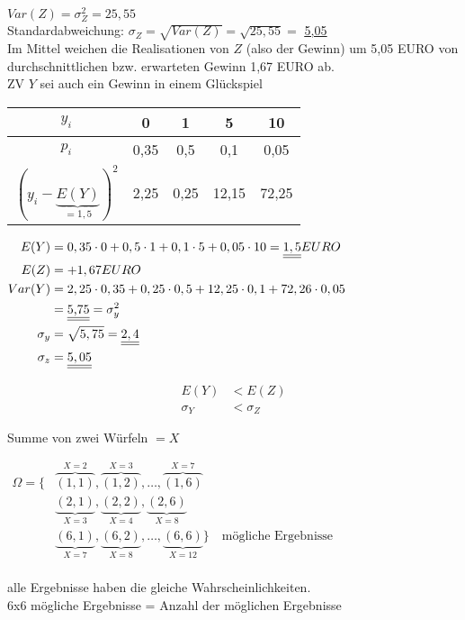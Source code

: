 $Var(Z) = \sigma_Z^2 = 25,55$\\
Standardabweichung: $\sigma_Z = \sqrt{Var(Z)} = \sqrt{25,55} = $ \underline{\underline{5,05}} \\

Im Mittel weichen die Realisationen von $Z$ (also der Gewinn) um 5,05 EURO von durchschnittlichen bzw. erwarteten Gewinn 1,67 EURO ab.\\

ZV $Y$ sei auch ein Gewinn in einem Glückspiel

\begin{tabular}{c | c c c c}
	$y_i$		&		0		&		1		&		5		&		10	\\
	\hline
	$p_i$		&	0,35	& 0,5		&		0,1	&	0,05  \\
	$(y_i -\underbrace{E(Y)}_{= 1,5})^2$
					&	2,25	&	0,25	&	12,15	&	72,25
\end{tabular}

$\begin{aligned}
	E(Y) &= 0,35 \cdot 0 + 0,5 \cdot 1 + 0,1 \cdot 5 + 0,05 \cdot 10 =
	\underline{\underline{1,5}} EURO \\
%
	E(Z) &= +1,67  EURO \\
%
	Var(Y) &= 2,25 \cdot 0,35 + 0,25 \cdot 0,5 + 12,25 \cdot 0,1 +
	72,26 \cdot 0,05 \\
	&= \text{\underline{\underline{5,75}}} = \sigma_y^2\\
%
	\sigma_y &= \sqrt{5,75} = \underline{\underline{2,4}} \\
%
	\sigma_z &= \underline{\underline{5,05}} \\
\end{aligned}$

$$\begin{aligned}
	E(Y)		 &<	E(Z) \\
	\sigma_Y &< \sigma_Z
\end{aligned}$$

Summe von zwei Würfeln $ = X$

$\begin{aligned}
\Omega = \Big\{& \overbrace{(1,1)}^{X=2}, \overbrace{(1,2)}^{X=3}, \dots , 
	\overbrace{(1,6)}^{X=7} \\
					 & \underbrace{(2,1)}_{X=3}, \underbrace{(2,2)}_{X=4}, 
	\underbrace{(2,6)}_{X=8} \\
	 				 & \underbrace{(6,1)}_{X=7}, \underbrace{(6,2)}_{X=8}, \dots ,
	\underbrace{(6,6)}_{X=12}\Big\} \quad \text{mögliche Ergebnisse}
\end{aligned}$
~\\
\\
alle Ergebnisse haben die gleiche Wahrscheinlichkeiten. \\
6x6 mögliche Ergebnisse = Anzahl der möglichen Ergebnisse

